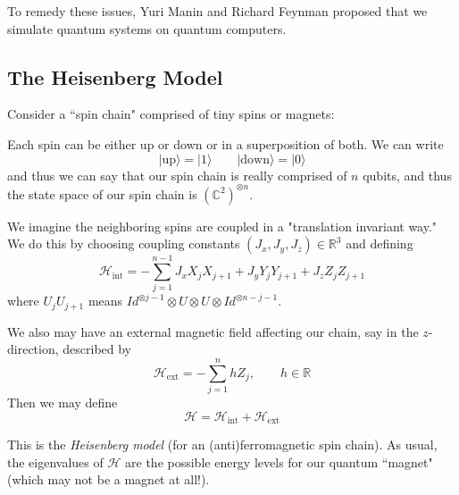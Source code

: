 \documentclass{article}
\begin{document}
\vspace{0.5cm}

To remedy these issues, Yuri Manin and Richard Feynman proposed that we simulate quantum systems on quantum computers.

\subsection{The Heisenberg Model}

Consider a ``spin chain" comprised of tiny spins or magnets:

\begin{center}
\end{center}

Each spin can be either up or down or in a superposition of both. We can write $$|\text{up}\rangle = |1\rangle \qquad |\text{down}\rangle = |0\rangle$$ and thus we can say that our spin chain is really comprised of $n$ qubits, and thus the state space of our spin chain is $(\mathbb C^2)^{\otimes n}$.

\vspace{0.5cm}

We imagine the neighboring spins are coupled in a "translation invariant way." We do this by choosing coupling constants $(J_x,J_y,J_z)\in \mathbb R^3$ and defining $$\mathcal H_{\text{int}} = -\sum_{j=1}^{n-1} J_x X_j X_{j+1} + J_y Y_j Y_{j+1} + J_z Z_j Z_{j+1}$$ where $U_jU_{j+1}$ means $Id^{\otimes j-1}\otimes U\otimes U \otimes Id^{\otimes n-j-1}$.

\vspace{0.5cm}

We also may have an external magnetic field affecting our chain, say in the $z$-direction, described by $$\mathcal H_{\text{ext}} = -\sum_{j=1}^n hZ_j,\qquad h\in \mathbb R$$ Then we may define $$\mathcal H = \mathcal H_{\text{int}} + \mathcal{H}_{\text{ext}}$$

This is the \textit{Heisenberg model} (for an (anti)ferromagnetic spin chain). As usual, the eigenvalues of $\mathcal H$ are the possible energy levels for our quantum ``magnet" (which may not be a magnet at all!).
\end{document}
